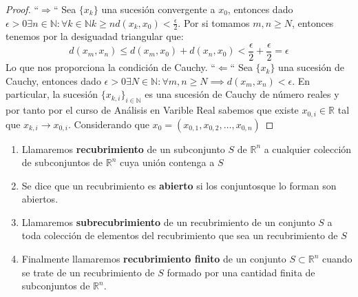 \begin{proof}
    ``$\Rightarrow$``
        Sea $\{x_k\}$ una sucesión convergente a $x_0$, entonces dado $\epsilon > 0 \exists n \in \mathbb{N} :\forall k \in \mathbb{N} k \geq nd(x_k, x_0) < \frac{\epsilon}{2}$. Por si tomamos $m, n \geq N$, entonces tenemos por la desiguadad triangular que: 
        $$d(x_m, x_n) \leq d(x_m, x_0) + d(x_n, x_0) < \frac{\epsilon}{2} + \frac{\epsilon}{2} = \epsilon$$
        Lo que nos proporciona la condición de Cauchy.
    ``$\Leftarrow$``
        Sea $\{x_k\}$ una sucesión de Cauchy, entonces dado $\epsilon > 0 \exists N \in \mathbb{N} : \forall m, n \geq N \implies d(x_m, x_n) < \epsilon$. En particular, la sucesión $\{x_{k,i}\}_{i \in \mathbb{N}}$ es una sucesión de Cauchy de número reales y por tanto por el curso de Análisis en Varible Real sabemos que existe $x_{0,i} \in \mathbb{R}$ tal que $x_{k,i} \to x_{0,i}$. Considerando que $x_0 = (x_{0,1}, x_{0,2}, \ldots, x_{0,n})$
\end{proof}

\begin{definición}
    \begin{enumerate}
        \item Llamaremos \textbf{recubrimiento} de un subconjunto $S$ de $\mathbb{R}^n$ a cualquier colección de subconjuntos de $\mathbb{R}^n$ cuya unión contenga a $S$
        \item Se dice que un recubrimiento es \textbf{abierto} si los conjuntosque lo forman son abiertos.
        \item Llamaremos \textbf{subrecubrimiento} de un recubrimiento de un conjunto $S$ a toda colección de elementos del recubrimiento que sea un recubrimiento de $S$
        \item Finalmente llamaremos \textbf{recubrimiento finito} de un conjunto $S \subset \mathbb{R}^n$ cuando se trate de un recubrimiento de $S$ formado por una cantidad finita de subconjuntos de $\mathbb{R}^n$.
    \end{enumerate}
\end{definición}

